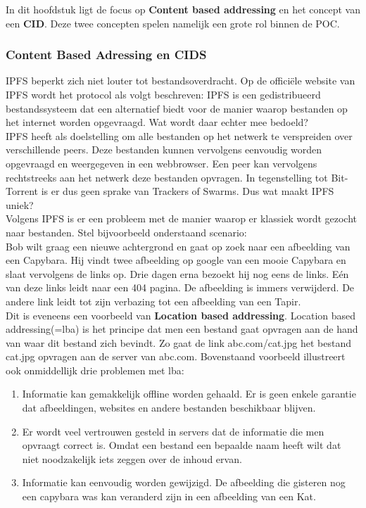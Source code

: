 In dit hoofdstuk ligt de focus op \textbf{Content based addressing} en het  concept van een \textbf{CID}. Deze twee concepten spelen namelijk een grote rol binnen de POC. 

\subsubsection{Content Based Adressing en CIDS}
\label{CBA}
IPFS beperkt zich niet louter tot bestandsoverdracht. Op de officiële website van IPFS wordt het protocol als volgt beschreven: IPFS is een gedistribueerd bestandssysteem dat een alternatief biedt voor de manier waarop bestanden op het internet worden opgevraagd. Wat wordt daar echter mee bedoeld?\\

IPFS heeft als doelstelling om alle bestanden op het netwerk te verspreiden over verschillende peers. Deze bestanden kunnen vervolgens eenvoudig worden opgevraagd en weergegeven in een webbrowser. Een peer kan vervolgens rechtstreeks aan het netwerk deze bestanden opvragen. In tegenstelling tot Bit-Torrent is er dus geen sprake van Trackers of Swarms. Dus wat maakt IPFS uniek?\\

Volgens IPFS is er een probleem met de manier waarop er klassiek wordt gezocht naar bestanden. Stel bijvoorbeeld onderstaand scenario:\\

Bob wilt graag een nieuwe achtergrond en gaat op zoek naar een afbeelding van een Capybara. Hij vindt twee afbeelding op google van een mooie Capybara en slaat vervolgens de links op. Drie dagen erna bezoekt hij nog eens de links. Eén van deze links leidt naar een 404 pagina. De afbeelding is immers verwijderd. De andere link leidt tot zijn verbazing tot een afbeelding van een Tapir.\\

Dit is eveneens een voorbeeld van \textbf{Location based addressing}. Location based addressing(=lba) is het principe dat men een bestand gaat opvragen aan de hand van waar dit bestand zich bevindt. Zo gaat de link abc.com/cat.jpg het bestand cat.jpg  opvragen aan de server van abc.com. Bovenstaand voorbeeld illustreert ook onmiddellijk drie problemen met lba:

\begin{enumerate}
\item Informatie kan gemakkelijk offline worden gehaald. Er is geen enkele garantie dat afbeeldingen, websites en andere bestanden beschikbaar blijven.\\
\item Er wordt veel vertrouwen gesteld in servers dat de informatie die men opvraagt correct is. Omdat een bestand een bepaalde naam heeft wilt dat niet noodzakelijk iets zeggen over de inhoud ervan.\\
\item Informatie kan eenvoudig worden gewijzigd. De afbeelding die gisteren nog een capybara was kan veranderd zijn in een afbeelding van een Kat.\\
\end{enumerate}

